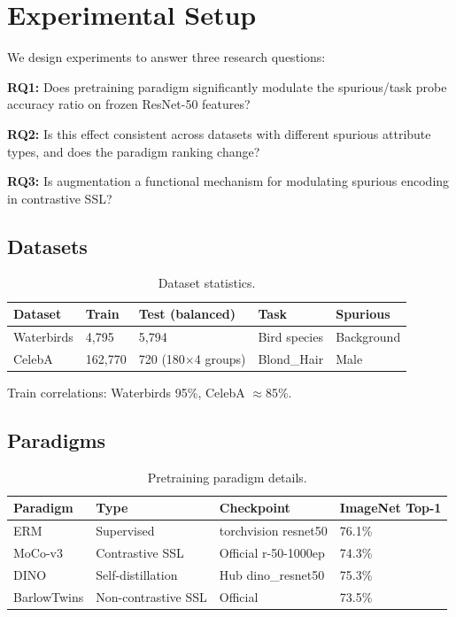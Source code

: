 \section{Experimental Setup}
\label{sec:experiments}

We design experiments to answer three research questions:

\textbf{RQ1:} Does pretraining paradigm significantly modulate the spurious/task probe accuracy ratio on frozen ResNet-50 features?

\textbf{RQ2:} Is this effect consistent across datasets with different spurious attribute types, and does the paradigm ranking change?

\textbf{RQ3:} Is augmentation a functional mechanism for modulating spurious encoding in contrastive SSL?

\subsection{Datasets}

\begin{table}[h]
\centering
\caption{Dataset statistics.}
\label{tab:datasets}
\begin{tabular}{lllll}
\toprule
Dataset & Train & Test (balanced) & Task & Spurious \\
\midrule
Waterbirds & 4,795 & 5,794 & Bird species & Background \\
CelebA & 162,770 & 720 (180$\times$4 groups) & Blond\_Hair & Male \\
\bottomrule
\end{tabular}
\end{table}

Train correlations: Waterbirds 95\%, CelebA $\approx$85\%.

\subsection{Paradigms}

\begin{table}[h]
\centering
\caption{Pretraining paradigm details.}
\label{tab:paradigms}
\begin{tabular}{llll}
\toprule
Paradigm & Type & Checkpoint & ImageNet Top-1 \\
\midrule
ERM & Supervised & torchvision resnet50 & 76.1\% \\
MoCo-v3 & Contrastive SSL & Official r-50-1000ep & 74.3\% \\
DINO & Self-distillation & Hub dino\_resnet50 & 75.3\% \\
BarlowTwins & Non-contrastive SSL & Official & 73.5\% \\
\bottomrule
\end{tabular}
\end{table}

